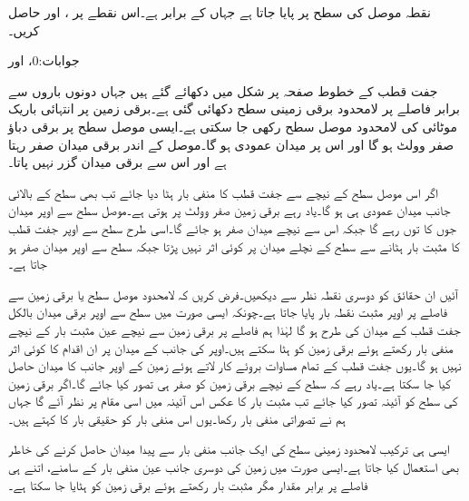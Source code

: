 نقطہ  موصل کی سطح پر پایا جاتا ہے جہاں  کے برابر ہے۔اس نقطے  پر ،  اور  حاصل کریں۔

جوابات:0،  اور 

جفت قطب کے خطوط صفحہ  پر  شکل  میں دکھائے گئے ہیں جہاں دونوں باروں سے برابر فاصلے پر لامحدود برقی زمینی سطح دکھائی گئی ہے۔برقی زمین پر انتہائی باریک موٹائی کی لامحدود موصل سطح رکھی جا سکتی ہے۔ایسی موصل سطح پر برقی دباؤ صفر وولٹ ہو گا اور اس پر میدان عمودی ہو گا۔موصل کے اندر برقی میدان صفر رہتا ہے اور اس سے برقی میدان گزر نہیں پاتا۔

اگر اس موصل سطح کے نیچے سے جفت قطب کا منفی بار ہٹا دیا جائے تب بھی سطح کے بالائی جانب میدان عمودی ہی ہو گا۔یاد رہے برقی زمین صفر وولٹ پر ہوتی ہے۔موصل سطح سے اوپر میدان جوں کا توں رہے گا جبکہ اس سے نیچے میدان صفر ہو جائے گا۔اسی طرح سطح سے اوپر  جفت قطب کا مثبت بار ہٹانے سے سطح کے نچلے میدان پر کوئی اثر نہیں پڑتا جبکہ سطح سے اوپر میدان صفر ہو جاتا ہے۔

آئیں ان حقائق کو دوسری نقطہ نظر سے دیکھیں۔فرض کریں کہ لامحدود موصل سطح یا برقی زمین سے  فاصلے پر  اوپر مثبت نقطہ بار  پایا جاتا ہے۔چونکہ ایسی صورت میں سطح سے اوپر برقی میدان بالکل جفت قطب کے میدان کی طرح ہو گا لہٰذا ہم  فاصلے پر برقی زمین سے نیچے عین مثبت بار کے نیچے منفی بار  رکھتے ہوئے برقی زمین کو ہٹا سکتے ہیں۔اوپر کی  جانب کے میدان پر ان اقدام کا کوئی اثر نہیں ہو گا۔یوں جفت قطب کے تمام مساوات بروئے کار لاتے ہوئے زمین کے اوپر جانب کا میدان حاصل کیا جا سکتا ہے۔یاد رہے کہ سطح کے نیچے برقی زمین کو صفر ہی تصور کیا جائے گا۔اگر برقی زمین کی سطح کو آئینہ تصور کیا جائے تب مثبت بار کا عکس اس آئینہ میں اسی مقام پر نظر آئے گا جہاں ہم نے تصوراتی منفی بار رکھا۔یوں اس منفی بار کو حقیقی بار کا  کہتے ہیں۔

ایسی ہی ترکیب لامحدود زمینی سطح کی ایک جانب منفی بار سے پیدا میدان حاصل کرنے کی خاطر بھی استعمال کیا جاتا ہے۔ایسی صورت میں زمین کی دوسری جانب عین منفی بار کے سامنے،  اتنے ہی فاصلے پر برابر مقدار مگر مثبت بار رکھتے ہوئے برقی زمین کو ہٹایا جا سکتا ہے۔

